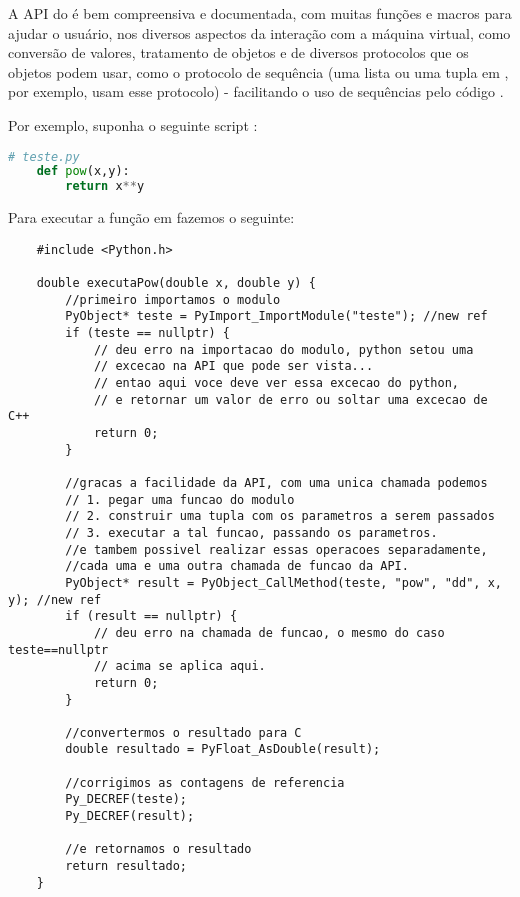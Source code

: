     A API \C{} do  é bem compreensiva e documentada, com muitas funções e
    macros para ajudar o usuário, nos diversos aspectos da interação com a
    máquina virtual, como conversão de valores, tratamento de objetos e de
    diversos protocolos que os objetos podem usar, como o protocolo de sequência
    (uma lista ou uma tupla em , por exemplo, usam esse protocolo) -
    facilitando o uso de sequências pelo código \C{}.
    
    Por exemplo, suponha o seguinte script :
      
    \vspace{1em}

    \begin{lstlisting}[language=python]
    # teste.py
    def pow(x,y):
        return x**y
    \end{lstlisting}
      
    \vspace{1em}
    
    Para executar a função  em \CXX{} fazemos o seguinte:
      
    \vspace{1em}

    \begin{lstlisting}
    #include <Python.h>
    
    double executaPow(double x, double y) {
        //primeiro importamos o modulo
        PyObject* teste = PyImport_ImportModule("teste"); //new ref
        if (teste == nullptr) {
            // deu erro na importacao do modulo, python setou uma 
            // excecao na API que pode ser vista...
            // entao aqui voce deve ver essa excecao do python,
            // e retornar um valor de erro ou soltar uma excecao de C++
            return 0;
        }
        
        //gracas a facilidade da API, com uma unica chamada podemos
        // 1. pegar uma funcao do modulo
        // 2. construir uma tupla com os parametros a serem passados
        // 3. executar a tal funcao, passando os parametros.
        //e tambem possivel realizar essas operacoes separadamente,
        //cada uma e uma outra chamada de funcao da API.
        PyObject* result = PyObject_CallMethod(teste, "pow", "dd", x, y); //new ref
        if (result == nullptr) {
            // deu erro na chamada de funcao, o mesmo do caso teste==nullptr
            // acima se aplica aqui.
            return 0;
        }
        
        //convertermos o resultado para C
        double resultado = PyFloat_AsDouble(result);
        
        //corrigimos as contagens de referencia
        Py_DECREF(teste);
        Py_DECREF(result);
        
        //e retornamos o resultado
        return resultado;
    }
    \end{lstlisting}
      
